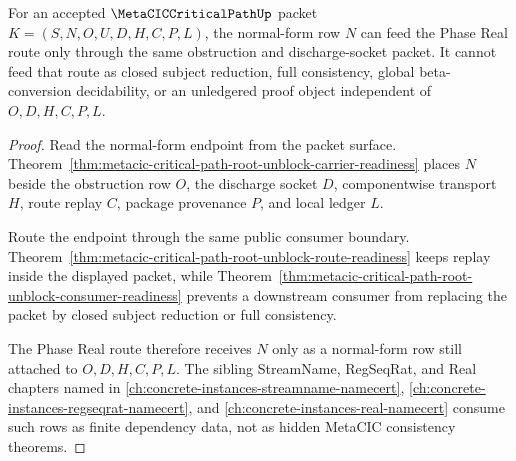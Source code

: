 \begin{theorem}
\label{thm:metacic-critical-path-phase-real-normal-form-handoff}
For an accepted $\MetaCICCriticalPathUp$ packet $K=(S,N,O,U,D,H,C,P,L)$, the normal-form row $N$ can feed the Phase Real route only through the same obstruction and discharge-socket packet. It cannot feed that route as closed subject reduction, full consistency, global beta-conversion decidability, or an unledgered proof object independent of $O,D,H,C,P,L$.
\end{theorem}
\begin{proof}
Read the normal-form endpoint from the packet surface. Theorem~\ref{thm:metacic-critical-path-root-unblock-carrier-readiness} places $N$ beside the obstruction row $O$, the discharge socket $D$, componentwise transport $H$, route replay $C$, package provenance $P$, and local ledger $L$.

Route the endpoint through the same public consumer boundary. Theorem~\ref{thm:metacic-critical-path-root-unblock-route-readiness} keeps replay inside the displayed packet, while Theorem~\ref{thm:metacic-critical-path-root-unblock-consumer-readiness} prevents a downstream consumer from replacing the packet by closed subject reduction or full consistency.

The Phase Real route therefore receives $N$ only as a normal-form row still attached to $O,D,H,C,P,L$. The sibling StreamName, RegSeqRat, and Real chapters named in \autoref{ch:concrete-instances-streamname-namecert}, \autoref{ch:concrete-instances-regseqrat-namecert}, and \autoref{ch:concrete-instances-real-namecert} consume such rows as finite dependency data, not as hidden MetaCIC consistency theorems.
\end{proof}

